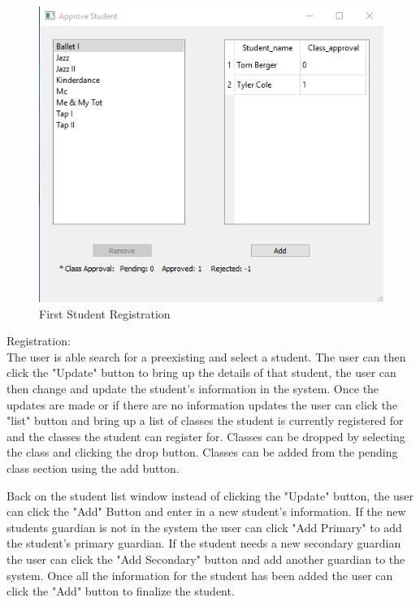 \begin{figure}
  \includegraphics[width=\linewidth]{pics/userGuide/Addstu.png}
  \caption{First Student Registration}
  \label{fig:User doc: First Student Registration}
\end{figure}

Registration:\\
The user is able search for a preexisting and select a student. The user can then click the "Update" button to bring up the details of that student, the user can then change and update the student's information in the system.  Once the updates are made or if there are no information updates the user can click the "list" button and bring up a list of classes the student is currently registered for and the classes the student can register for. Classes can be dropped by selecting the class and clicking the drop button. Classes can be added from the pending class section using the add button.

Back on the student list window instead of clicking the "Update" button, the user can click the "Add" Button and enter in a new student's information. If the new students guardian is not in the system the user can click "Add Primary" to add the student's primary guardian. If the student needs a new secondary guardian the user can click the "Add Secondary" button and add another guardian to the system.  Once all the information for the student has been added the user can click the "Add" button to finalize the student.

